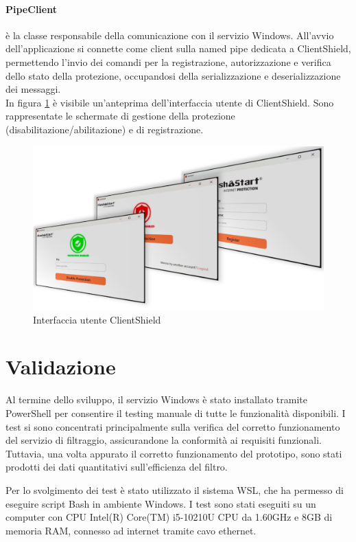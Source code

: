 \documentclass[12pt,a4paper,openright,twoside]{book}
\begin{document}
\paragraph{PipeClient} è la classe responsabile della comunicazione con il servizio Windows.
All'avvio dell'applicazione si connette come client sulla named pipe dedicata a ClientShield, permettendo l'invio dei comandi per la registrazione, autorizzazione e verifica dello stato della protezione, occupandosi della serializzazione e deserializzazione dei messaggi.\\

In figura \ref{fig:schermate-app} è visibile un'anteprima dell'interfaccia utente di ClientShield.
Sono rappresentate le schermate di gestione della protezione (disabilitazione/abilitazione) e di registrazione.
\begin{figure}[H]
	\centering
	\includegraphics[width=1.0\textwidth]{figures/schermate.pdf}
	\caption{Interfaccia utente ClientShield}
	\label{fig:schermate-app}
\end{figure}


\section{Validazione}

Al termine dello sviluppo, il servizio Windows è stato installato tramite PowerShell per consentire il testing manuale di tutte le funzionalità disponibili.
I test si sono concentrati principalmente sulla verifica del corretto funzionamento del servizio di filtraggio, assicurandone la conformità ai requisiti funzionali.
Tuttavia, una volta appurato il corretto funzionamento del prototipo, sono stati prodotti dei dati quantitativi sull'efficienza del filtro.

Per lo svolgimento dei test è stato utilizzato il sistema \gls{WSL}, che ha permesso di eseguire script Bash in ambiente Windows.
I test sono stati eseguiti su un computer con CPU Intel(R) Core(TM) i5-10210U CPU da 1.60GHz e 8GB di memoria RAM, connesso ad internet tramite cavo ethernet.
\end{document}
